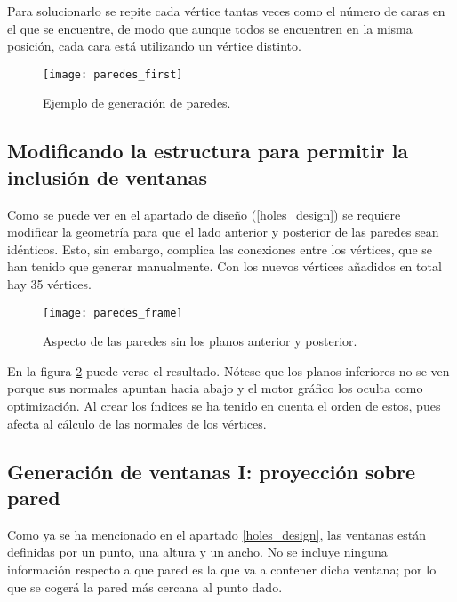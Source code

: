 Para solucionarlo se repite cada vértice tantas veces como el número de caras en el que se encuentre, de modo que aunque todos se encuentren en la misma posición, cada cara está utilizando un vértice distinto.

\begin{figure}[H]
    \centering
    \texttt{[image: paredes\_first]}
    \caption{Ejemplo de generación de paredes.}
    \label{fig:paredes_first}
\end{figure}

\subsection{Modificando la estructura para permitir la inclusión de ventanas}
\label{subsec:gen2}
Como se puede ver en el apartado de diseño (\ref{holes_design}) se requiere modificar la geometría para que el lado anterior y posterior de las paredes sean idénticos. Esto, sin embargo, complica las conexiones entre los vértices, que se han tenido que generar manualmente. Con los nuevos vértices añadidos en total hay 35 vértices.

\begin{figure}[H]
    \centering
    \texttt{[image: paredes\_frame]}
    \caption{Aspecto de las paredes sin los planos anterior y posterior.}
    \label{fig:nueva_estructura}
\end{figure}

En la figura \ref{fig:nueva_estructura} puede verse el resultado. Nótese que los planos inferiores no se ven porque sus normales apuntan hacia abajo y el motor gráfico los oculta como optimización. Al crear los índices se ha tenido en cuenta el orden de estos, pues afecta al cálculo de las normales de los vértices.

\subsection{Generación de ventanas I: proyección sobre pared}
\label{sec:wallgenwindowsi}
Como ya se ha mencionado en el apartado \ref{holes_design}, las ventanas están definidas por un punto, una altura y un ancho. No se incluye ninguna información respecto a que pared es la que va a contener dicha ventana; por lo que se cogerá la pared más cercana al punto dado.

